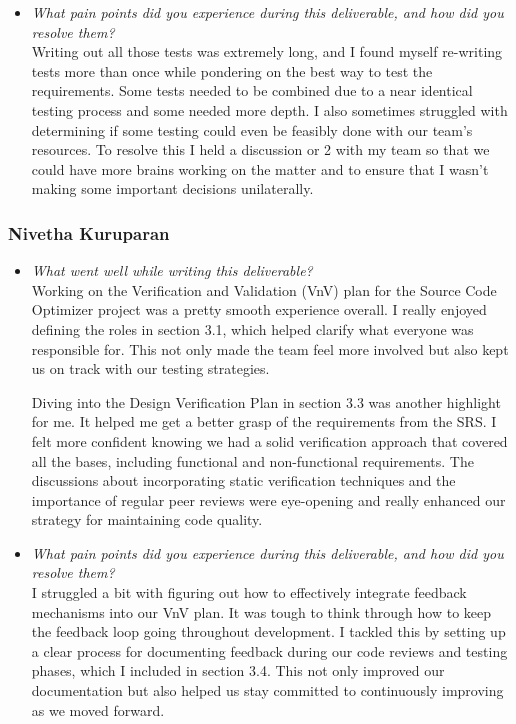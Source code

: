 \documentclass[12pt, titlepage]{article}
\begin{document}
\begin{appendices}
\begin{itemize}
  \item \textit{What pain points did you experience during this deliverable, and how did you resolve them?}\\
  
  Writing out all those tests was extremely long, and I found myself re-writing tests more than once while pondering on the best way to test the requirements. Some tests needed to be combined due to a near identical testing process and some needed more depth. I also sometimes struggled with determining if some testing could even be feasibly done with our team's resources. To resolve this I held a discussion or 2 with my team so that we could have more brains working on the matter and to ensure that I wasn't making some important decisions unilaterally.
\end{itemize}

\subsubsection*{Nivetha Kuruparan}
\begin{itemize}
  \item \textit{What went well while writing this deliverable?} \\
  
    Working on the Verification and Validation (VnV) plan for the Source Code Optimizer project was a pretty smooth experience overall. I really enjoyed defining the roles in section 3.1, which helped clarify what everyone was responsible for. This not only made the team feel more involved but also kept us on track with our testing strategies.
    
    Diving into the Design Verification Plan in section 3.3 was another highlight for me. It helped me get a better grasp of the requirements from the SRS. I felt more confident knowing we had a solid verification approach that covered all the bases, including functional and non-functional requirements. The discussions about incorporating static verification techniques and the importance of regular peer reviews were eye-opening and really enhanced our strategy for maintaining code quality.

  \item \textit{What pain points did you experience during this deliverable, and how did you resolve them?}\\

  I struggled a bit with figuring out how to effectively integrate feedback mechanisms into our VnV plan. It was tough to think through how to keep the feedback loop going throughout development. I tackled this by setting up a clear process for documenting feedback during our code reviews and testing phases, which I included in section 3.4. This not only improved our documentation but also helped us stay committed to continuously improving as we moved forward.
  

\end{itemize}
\end{appendices}
\end{document}
